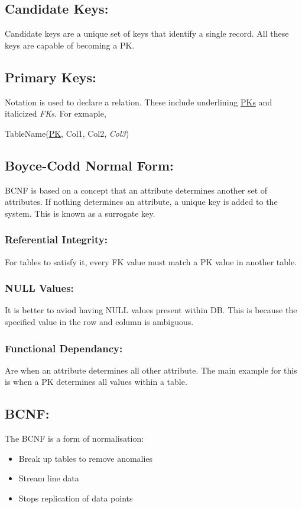 \documentclass[a5paper]{article}
\begin{document}
	\subsection{Candidate Keys:}
	Candidate keys are a unique set of keys that identify a single record. All these keys are capable of becoming a PK.
	\subsection{Primary Keys:}
	Notation is used to declare a relation. These include underlining \underline{PKs} and italicized \textit{FKs}. For exmaple,
	\begin{center}
		TableName(\underline{PK}, Col1, Col2, \textit{Col3})
	\end{center}
	\subsection{Boyce-Codd Normal Form:}
	BCNF is based on a concept that an attribute determines another set of attributes. If nothing determines an attribute, a unique key is added to the system. This is known as a surrogate key.
	\subsubsection{Referential Integrity:}
	For tables to satisfy it, every FK value must match  a PK value in another table.
	\subsubsection{NULL Values:}
	It is better to aviod having NULL values present within DB. This is because the specified value in the row and column is ambiguous.
	\subsubsection{Functional Dependancy:}
	Are when an attribute determines all other attribute. The main example for this is when a PK determines all values within a table.
	\subsection{BCNF:}
	The BCNF is a form of normalisation:
	\begin{itemize}
		\item Break up tables to remove anomalies
		\item Stream line data
		\item Stops replication of data points
	\end{itemize}
\end{document}
